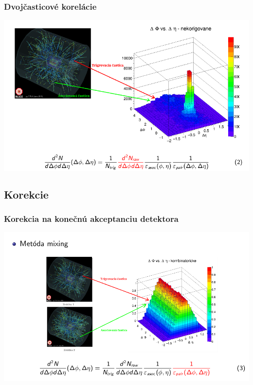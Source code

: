 \documentclass{beamer}
\begin{document}
	\begin{frame}
		\frametitle{Dvojčasticové korelácie}
		\centering \includegraphics[scale=0.55]{../Obrazky_praca/siblings.png}
	\end{frame}

\subsection{Korekcie}

	\begin{frame}
		\frametitle{Korekcia na konečnú akceptanciu detektora}
		\centering 
		\includegraphics[scale=0.5]{../Obrazky_praca/mixing.png}
	\end{frame}
\end{document}
